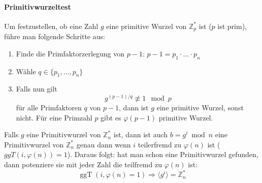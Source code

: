 \documentclass[8pt,a4paper,landscape]{article}
\begin{document}
\begin{multicols}{4}
\paragraph{Primitivwurzeltest} Um festzustellen, ob eine Zahl $g$ eine primitive Wurzel von 
$\mathbb{Z}_{p}^{*}$ ist ($p$ ist prim), führe man folgende Schritte aus:
\begin{enumerate}
\item Finde die Primfaktorzerlegung von $p-1$: \( p-1=p_{1} \cdot \ldots \cdot  p_{n}\)
\item Wähle \(q \in \{p_{1}, \ldots,p_{n}\}\)
\item Falls nun gilt
\[
    \boxed{ g^{(p-1)/q} \not\equiv 1 \mod p }
\]
für alle Primfaktoren $q$ von $p-1$, dann ist $g$ eine primitive Wurzel,
sonst nicht. Für eine Primzahl $p$ gibt es $\varphi(p-1)$ primitive Wurzel.
\end{enumerate}
Falls $g$ eine Primitivwurzel von $\mathbb{Z}_{n}^{*}$ ist, dann ist auch 
$b = g^{i} \bmod n$ eine Primitivwurzel von $\mathbb{Z}_{n}^{*}$ genau dann 
wenn $i$ teilerfremd zu $\varphi(n)$ ist ($ggT(i, \varphi(n)) = 1$). Daraus folgt:
hat man schon eine Primitivwurzel gefunden, dann potenziere sie mit jeder Zahl die teilfremd zu $\varphi(n)$ ist:
\[
    \operatorname{ggT}(i, \varphi(n) = 1) \Rightarrow
    \langle g^{i} \rangle = \mathbb{Z}_{n}^{*}
\]


\end{multicols}
\end{document}
